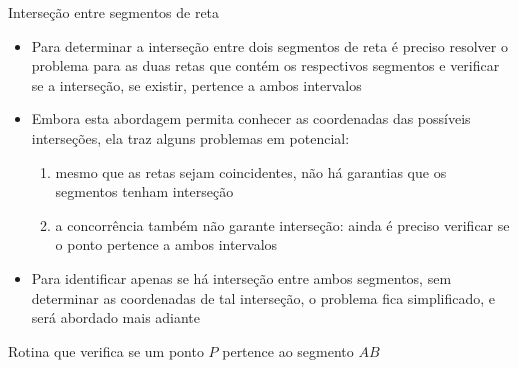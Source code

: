 \begin{frame}[fragile]{Interseção entre segmentos de reta}

    \begin{itemize}
        \item Para determinar a interseção entre dois segmentos de reta é preciso resolver o
            problema para as duas retas que contém os respectivos segmentos e verificar se a interseção, se existir, pertence a ambos intervalos
        \pause

        \item Embora esta abordagem permita conhecer as coordenadas das possíveis interseções, ela              traz alguns problemas em potencial:
        \pause

        \begin{enumerate}
            \item mesmo que as retas sejam coincidentes, não há garantias que os segmentos
                tenham interseção
        \pause

            \item a concorrência também não garante interseção: ainda é preciso verificar se o ponto pertence a ambos intervalos
        \end{enumerate}
        \pause

        \item Para identificar apenas se há interseção entre ambos segmentos, sem determinar
            as coordenadas de tal interseção, o problema fica simplificado, e será abordado
            mais adiante
    \end{itemize}

\end{frame}

\begin{frame}[fragile]{Rotina que verifica se um ponto $P$ pertence ao segmento $AB$}
\end{frame}
